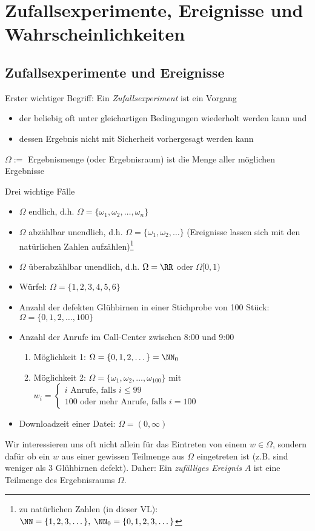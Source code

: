 \documentclass{scrreprt}
\begin{document}
\section{Zufallsexperimente, Ereignisse und Wahrscheinlichkeiten}
\subsection{Zufallsexperimente und Ereignisse}
Erster wichtiger Begriff:
Ein \emph{Zufallsexperiment} ist ein Vorgang
\begin{itemize}
\item der beliebig oft unter gleichartigen Bedingungen wiederholt werden kann und
\item dessen Ergebnis nicht mit Sicherheit vorhergesagt werden kann
\end{itemize}
$\Omega:=$ Ergebnismenge (oder Ergebnisraum) ist die Menge aller möglichen Ergebnisse

 Drei wichtige Fälle
\begin{itemize}
\item $\Omega$ endlich, d.h. $\Omega=\{\omega_1,\omega_2,\dots,\omega_n\}$
\item $\Omega$ abzählbar unendlich, d.h. $\Omega=\{\omega_1,\omega_2,\dots\}$ (Ereignisse lassen sich mit den natürlichen Zahlen aufzählen)\footnote{zu natürlichen Zahlen (in dieser VL): $\NN=\{1,2,3,\dots\}, \; \NN_0=\{0,1,2,3,\dots\}$}
\item $\Omega$ überabzählbar unendlich, d.h. $\Omega=\RR$ oder $\Omega [0,1)$
\end{itemize}

\begin{itemize}
\item Würfel: $\Omega=\{1,2,3,4,5,6\}$
\item Anzahl der defekten Glühbirnen in einer Stichprobe von 100 Stück: $\Omega=\{0,1,2,\dots,100\}$
\item Anzahl der Anrufe im Call-Center zwischen 8:00 und 9:00
\begin{enumerate}
\item Möglichkeit 1: $\Omega = \{0,1,2,\dots\}=\NN_0$
\item Möglichkeit 2: $\Omega = \{\omega_1,\omega_2,\dots, \omega_{100}\}$ mit \\
$w_i =\begin{cases}
i \text{ Anrufe, falls }i\leq 99\\
100 \text{ oder mehr Anrufe, falls }i=100
\end{cases}$
\end{enumerate}
\item Downloadzeit einer Datei: $\Omega = (0,\infty)$
\end{itemize}
Wir interessieren uns oft nicht allein für das Eintreten von einem $w\in \Omega$, sondern dafür ob ein $w$ aus einer gewissen Teilmenge aus $\Omega$ eingetreten ist (z.B. sind weniger als $3$ Glühbirnen defekt). Daher:
 Ein \emph{zufälliges Ereignis} $A$ ist eine Teilmenge des Ergebnisraums $\Omega$. 
\end{document}
